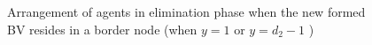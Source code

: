 \begin{itemize}
\begin{figure} [H]
      \hspace{1in} 
  \caption{Arrangement of agents in elimination phase when the new formed BV resides in a border node (when $y=1$ or $y=d_2-1$ ) } 
  \label{fig:subfigmesh3} %
\end{figure}


\end{itemize}
